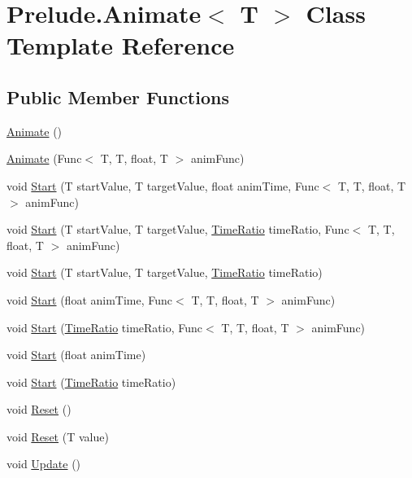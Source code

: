 \hypertarget{class_prelude_1_1_animate_3_01_t_01_4}{\section{Prelude.\+Animate$<$ T $>$ Class Template Reference}
\label{class_prelude_1_1_animate_3_01_t_01_4}
}
\subsection*{Public Member Functions}
\begin{DoxyCompactItemize}
\item 
\hyperlink{class_prelude_1_1_animate_3_01_t_01_4_a60e2e240b97bdad615891a8974a75b85}{Animate} ()
\item 
\hyperlink{class_prelude_1_1_animate_3_01_t_01_4_a3f5458e672ffd679b44b42a968328da5}{Animate} (Func$<$ T, T, float, T $>$ anim\+Func)
\item 
void \hyperlink{class_prelude_1_1_animate_3_01_t_01_4_a8e3f523b8175a197216e7020ff865135}{Start} (T start\+Value, T target\+Value, float anim\+Time, Func$<$ T, T, float, T $>$ anim\+Func)
\item 
void \hyperlink{class_prelude_1_1_animate_3_01_t_01_4_aa2c59480e2b90bffd546971c99043a7e}{Start} (T start\+Value, T target\+Value, \hyperlink{class_prelude_1_1_time_ratio}{Time\+Ratio} time\+Ratio, Func$<$ T, T, float, T $>$ anim\+Func)
\item 
void \hyperlink{class_prelude_1_1_animate_3_01_t_01_4_aaebac11d5fe3ac9261992dfe73ddc9ff}{Start} (T start\+Value, T target\+Value, \hyperlink{class_prelude_1_1_time_ratio}{Time\+Ratio} time\+Ratio)
\item 
void \hyperlink{class_prelude_1_1_animate_3_01_t_01_4_a80c30247d71413f36a38827041223759}{Start} (float anim\+Time, Func$<$ T, T, float, T $>$ anim\+Func)
\item 
void \hyperlink{class_prelude_1_1_animate_3_01_t_01_4_a0ce30fa97aa21ee0e99624d3f5e0b502}{Start} (\hyperlink{class_prelude_1_1_time_ratio}{Time\+Ratio} time\+Ratio, Func$<$ T, T, float, T $>$ anim\+Func)
\item 
void \hyperlink{class_prelude_1_1_animate_3_01_t_01_4_a94cd56f14c11d1822c685780b39a9063}{Start} (float anim\+Time)
\item 
void \hyperlink{class_prelude_1_1_animate_3_01_t_01_4_a256e6ee3017cd64aa2248514c3d49008}{Start} (\hyperlink{class_prelude_1_1_time_ratio}{Time\+Ratio} time\+Ratio)
\item 
void \hyperlink{class_prelude_1_1_animate_3_01_t_01_4_a89371c62b66f29a4306d5ff9a2371c89}{Reset} ()
\item 
void \hyperlink{class_prelude_1_1_animate_3_01_t_01_4_a792bb2d92e338da46c219099a7faa5d2}{Reset} (T value)
\item 
void \hyperlink{class_prelude_1_1_animate_3_01_t_01_4_ac2e3a510d67a34fc57c27e120ee2936a}{Update} ()
\end{DoxyCompactItemize}
